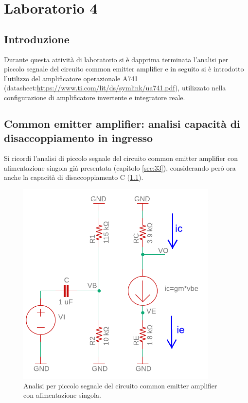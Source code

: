 \chapter{Laboratorio 4}
\section{Introduzione}
Durante questa attività di laboratorio si è dapprima terminata l'analisi per piccolo segnale del circuito common emitter amplifier e in seguito si è introdotto l'utilizzo del amplificatore operazionale \textmu A741 (datasheet:\url{https://www.ti.com/lit/ds/symlink/ua741.pdf}), utilizzato nella configurazione di amplificatore invertente e integratore reale.

\section{Common emitter amplifier: analisi capacità di disaccoppiamento in ingresso}
Si ricordi l'analisi di piccolo segnale del circuito common emitter amplifier con alimentazione singola già presentata (capitolo \ref{sec:33}), considerando però ora anche la capacità di disaccoppiamento C (\Fig\ref{fig:commonemitter_se_c_AC}).
\begin{figure}[h!]
	\centering
	\includegraphics[width=0.4\linewidth]{./OtherFiles/Laboratorio 4/common emitter_se_c-piccolo segnale-printout}
	\caption{Analisi per piccolo segnale del circuito common emitter amplifier con alimentazione singola.}
	\label{fig:commonemitter_se_c_AC}
\end{figure}

